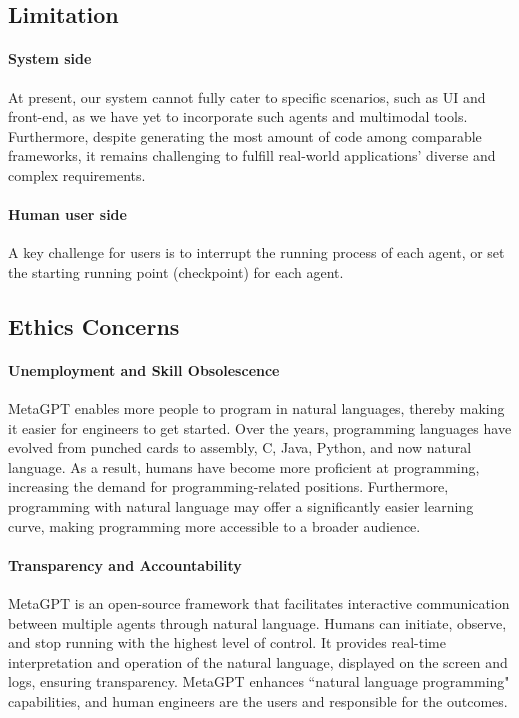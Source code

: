\subsection{Limitation}
\paragraph{System side} At present, our system cannot fully cater to specific scenarios, such as UI and front-end, as we have yet to incorporate such agents and multimodal tools. Furthermore, despite generating the most amount of code among comparable frameworks, it remains challenging to fulfill real-world applications' diverse and complex requirements.

\paragraph{Human user side} A key challenge for users is to interrupt the running process of each agent, or set the starting running point (checkpoint) for each agent.

\subsection{Ethics Concerns}
\paragraph{Unemployment and Skill Obsolescence} MetaGPT enables more people to program in natural languages, thereby making it easier for engineers to get started. Over the years, programming languages have evolved from punched cards to assembly, C, Java, Python, and now natural language. As a result, humans have become more proficient at programming, increasing the demand for programming-related positions. Furthermore, programming with natural language may offer a significantly easier learning curve, making programming more accessible to a broader audience.

\paragraph{Transparency and Accountability} MetaGPT is an open-source framework that facilitates interactive communication between multiple agents through natural language. Humans can initiate, observe, and stop running with the highest level of control. It provides real-time interpretation and operation of the natural language, displayed on the screen and logs, ensuring transparency. MetaGPT enhances ``natural language programming" capabilities, and human engineers are the users and responsible for the outcomes.

